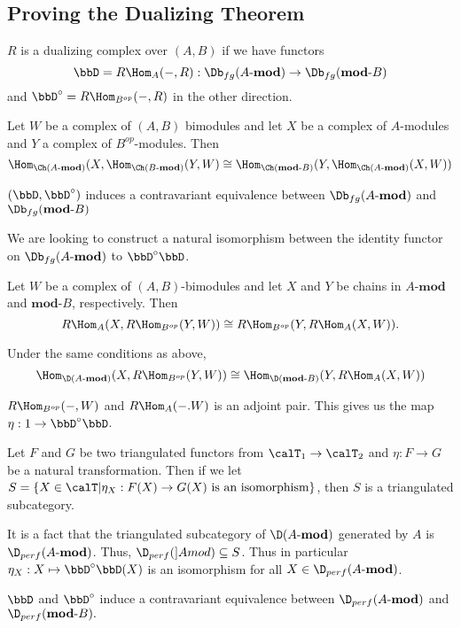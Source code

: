\documentclass[12pt]{article}
\newcommand*{\Amod}{A\text{-}\mathbf{mod}}
\begin{document}
\subsection{Proving the Dualizing Theorem}
\begin{defn}
	$R$ is a dualizing complex over $(A,B)$ if we have functors 
	\[\bbD=R\Hom_A(-,R):\Db_{fg}(\Amod)\to \Db_{fg}(\mathbf{mod}\text{-}B)\]
	and $\bbD^\circ=R\Hom_{B^{op}}(-,R)$ in the other direction.
\end{defn}
\begin{lem}
	Let $W$ be a complex of $(A,B)$ bimodules and let $X$ be a complex of $A$-modules and $Y$ a complex of $B^{op}$-modules. Then 
	\[\Hom_{\Ch(\Amod)}(X,\Hom_{\Ch(B\text{-}\mathbf{mod})}(Y,W)\cong\Hom_{\Ch(\mathbf{mod}\text{-}B)}(Y,\Hom_{\Ch(\Amod)}(X,W))\]
\end{lem}
\begin{thm}\label{thm-dualizing}
	$(\bbD,\bbD^\circ)$ induces a contravariant equivalence between $\Db_{fg}(\Amod)$ and $\Db_{fg}(\mathbf{mod}\text{-}B)$
\end{thm}
\begin{rmk}
	We are looking to construct a natural isomorphism between the identity functor on $\Db_{fg}(\Amod)$ to $\bbD^\circ\bbD$.
\end{rmk}
\begin{lem}
	Let $W$ be a complex of $(A,B)$-bimodules and let $X$ and $Y$ be chains in $\Amod$ and $\mathbf{mod}\text{-}B$, respectively. Then 
	\[R\Hom_A(X,R\Hom_{B^{op}}(Y,W))\cong R\Hom_{B^{op}}(Y,R\Hom_A(X,W)).\]
\end{lem}
\begin{lem}
	Under the same conditions as above,
	\[\Hom_{\D(\Amod)}(X,R\Hom_{B^{op}}(Y,W))\cong\Hom_{\D(\mathbf{mod}\text{-}B)}(Y,R\Hom_A(X,W))\]
\end{lem}
\begin{cor}
	$R\Hom_{B^{op}}(-,W)$ and $R\Hom_A(-.W)$ is an adjoint pair. This gives us the map $\eta:1\to\bbD^\circ\bbD$.
\end{cor}
\begin{lem}
	Let $F$ and $G$ be two triangulated functors from $\calT_1\to\calT_2$ and $\eta:F\to G$ be a natural transformation. Then 
	if we let $S=\{X\in\calT|\eta_X:F(X)\to G(X)\text{ is an isomorphism}\}$, then $S$ is a triangulated subcategory.
\end{lem}
\begin{cor}
	It is a fact that the triangulated subcategory of $\D(\Amod)$ generated by $A$ is $\D_{perf}(\Amod)$. Thus, $\D_{perf}(]Amod)\subseteq S$.
	Thus in particular $\eta_X:X\mapsto\bbD^\circ\bbD(X)$ is an isomorphism for all $X\in\D_{perf}(\Amod)$.
\end{cor}
\begin{cor}
	$\bbD$ and $\bbD^\circ$ induce a contravariant equivalence between $\D_{perf}(\Amod)$ and $\D_{perf}(\mathbf{mod}\text{-}B).$
\end{cor}
\end{document}
